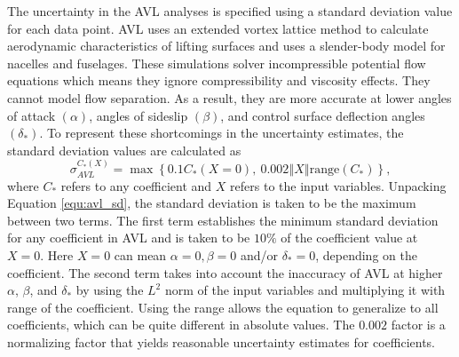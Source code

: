The uncertainty in the AVL analyses is specified using a standard deviation value for each data point. 
AVL uses an extended vortex lattice method to calculate aerodynamic characteristics of lifting surfaces and uses a slender-body model for nacelles and fuselages. 
These simulations solver incompressible potential flow equations which means they ignore compressibility and viscosity effects. 
They cannot model flow separation.
As a result, they are more accurate at lower angles of attack $(\alpha)$, angles of sideslip $(\beta)$, and control surface deflection angles $(\delta_*)$.
To represent these shortcomings in the uncertainty estimates, the standard deviation values are calculated as
\begin{equation}\label{equ:avl_sd}
    \sigma_{AVL}^{C_*(X)} = \max \left \{ 0.1C_*(X=0),~0.002 \left \Vert X \right \Vert \mathrm{range}(C_*) \right \},
\end{equation}
where $C_*$ refers to any coefficient and $X$ refers to the input variables.
Unpacking Equation \ref{equ:avl_sd}, the standard deviation is taken to be the maximum between two terms.
The first term establishes the minimum standard deviation for any coefficient in AVL and is taken to be $10\%$ of the coefficient value at $X =0$. 
Here $X=0$ can mean $\alpha=0, \beta=0$ and/or $\delta_* = 0$, depending on the coefficient.
The second term takes into account the inaccuracy of AVL at higher $\alpha$, $\beta$, and $\delta_*$ by using the $L^2$ norm of the input variables and multiplying it with range of the coefficient.
Using the range allows the equation to generalize to all coefficients, which can be quite different in absolute values.
The $0.002$ factor is a normalizing factor that yields reasonable uncertainty estimates for coefficients.

